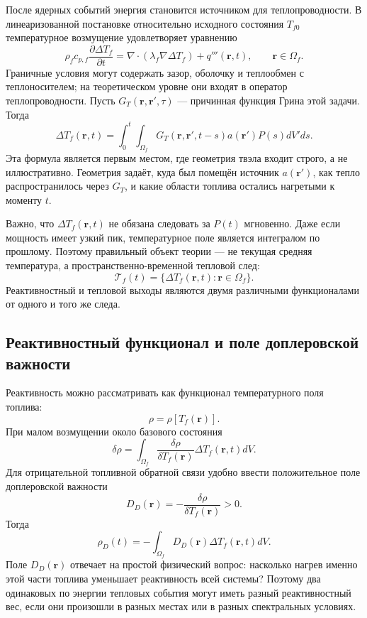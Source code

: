 \documentclass[12pt]{article}
\begin{document}
После ядерных событий энергия становится источником для теплопроводности. В линеаризованной постановке относительно исходного состояния \(T_{f0}\) температурное возмущение удовлетворяет уравнению
\[
\rho_f c_{p,f}\frac{\partial \Delta T_f}{\partial t}
=
\nabla\cdot\left(\lambda_f\nabla\Delta T_f\right)
+
q'''(\mathbf r,t),
\qquad
\mathbf r\in\Omega_f.
\]
Граничные условия могут содержать зазор, оболочку и теплообмен с теплоносителем; на теоретическом уровне они входят в оператор теплопроводности. Пусть \(G_T(\mathbf r,\mathbf r',\tau)\) --- причинная функция Грина этой задачи. Тогда
\[
\Delta T_f(\mathbf r,t)
=
\int_0^t\int_{\Omega_f}
G_T(\mathbf r,\mathbf r',t-s)a(\mathbf r')P(s)dV'ds.
\]
Эта формула является первым местом, где геометрия твэла входит строго, а не иллюстративно. Геометрия задаёт, куда был помещён источник \(a(\mathbf r')\), как тепло распространилось через \(G_T\), и какие области топлива остались нагретыми к моменту \(t\).

Важно, что \(\Delta T_f(\mathbf r,t)\) не обязана следовать за \(P(t)\) мгновенно. Даже если мощность имеет узкий пик, температурное поле является интегралом по прошлому. Поэтому правильный объект теории --- не текущая средняя температура, а пространственно-временной тепловой след:
\[
\mathcal T_f(t)=\{\Delta T_f(\mathbf r,t):\mathbf r\in\Omega_f\}.
\]
Реактивностный и тепловой выходы являются двумя различными функционалами от одного и того же следа.

\subsection{Реактивностный функционал и поле доплеровской важности}

Реактивность можно рассматривать как функционал температурного поля топлива:
\[
\rho=\rho[T_f(\mathbf r)].
\]
При малом возмущении около базового состояния
\[
\delta\rho
=
\int_{\Omega_f}
\frac{\delta\rho}{\delta T_f(\mathbf r)}
\Delta T_f(\mathbf r,t)dV.
\]
Для отрицательной топливной обратной связи удобно ввести положительное поле доплеровской важности
\[
D_D(\mathbf r)
=
-\frac{\delta\rho}{\delta T_f(\mathbf r)}>0.
\]
Тогда
\[
\rho_D(t)
=
-\int_{\Omega_f}D_D(\mathbf r)\Delta T_f(\mathbf r,t)dV.
\]
Поле \(D_D(\mathbf r)\) отвечает на простой физический вопрос: насколько нагрев именно этой части топлива уменьшает реактивность всей системы? Поэтому два одинаковых по энергии тепловых события могут иметь разный реактивностный вес, если они произошли в разных местах или в разных спектральных условиях.
\end{document}
